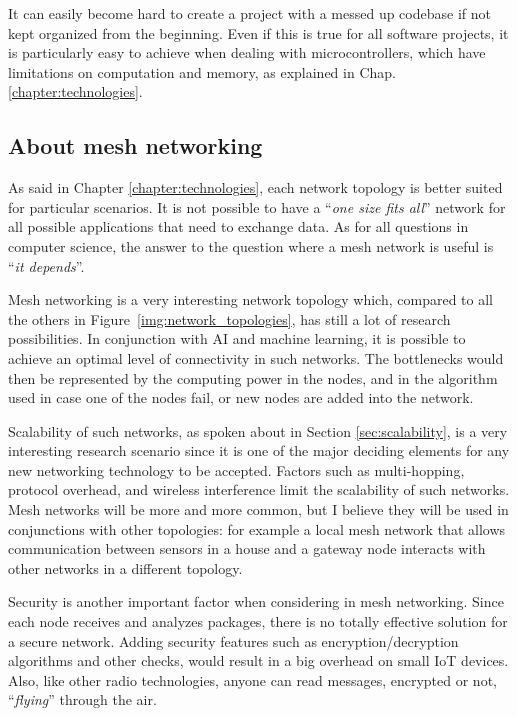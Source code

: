 			It can easily become hard to create a project with a messed up codebase if not kept organized from the beginning.
			Even if this is true for all software projects, it is particularly easy to achieve when dealing with microcontrollers, which have limitations on computation and memory, as explained in Chap. \ref{chapter:technologies}.
			
		\subsection{About mesh networking}\label{sec:mesh_considerations}
		
			As said in Chapter \ref{chapter:technologies}, each network topology is better suited for particular scenarios.
			It is not possible to have a ``\textit{one size fits all}'' network for all possible applications that need to exchange data.
			As for all questions in computer science, the answer to the question where a mesh network is useful is ``\textit{it depends}''.
			
			Mesh networking is a very interesting network topology which, compared to all the others in Figure~\ref{img:network_topologies}, has still a lot of research possibilities.
			In conjunction with AI and machine learning, it is possible to achieve an optimal level of connectivity in such networks.
			The bottlenecks would then be represented by the computing power in the nodes, and in the algorithm used in case one of the nodes fail, or new nodes are added into the network.

			Scalability of such networks, as spoken about in Section \ref{sec:scalability}, is a very interesting research scenario since it is one of the major deciding elements for any new networking technology to be accepted.
			Factors such as multi-hopping, protocol overhead, and wireless interference limit the scalability of such networks.
			Mesh networks will be more and more common, but I believe they will be used in conjunctions with other topologies: for example a local mesh network that allows communication between sensors in a house and a gateway node interacts with other networks in a different topology.
			
			Security is another important factor when considering in mesh networking.
			Since each node receives and analyzes packages, there is no totally effective solution for a secure network.
			Adding security features such as encryption/decryption algorithms and other checks, would result in a big overhead on small IoT devices.
			Also, like other radio technologies, anyone can read messages, encrypted or not, ``\textit{flying}'' through the air.